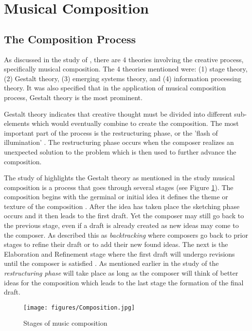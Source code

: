 \section{Musical Composition}
\subsection{The Composition Process}
As discussed in the study of , there are 4 theories involving the creative process, specifically musical composition. The 4 theories mentioned were: (1) stage theory, (2) Gestalt theory, (3) emerging systems theory, and (4) information processing theory. It was also specified that in the application of musical composition process, Gestalt theory is the most prominent. 

Gestalt theory indicates that creative thought must be divided into different sub-elements which would eventually combine to create the composition. The most important part of the process is the restructuring phase, or the 'flash of illumination' \cite{collins2005synthesis}. The restructuring phase occurs when the composer realizes an unexpected solution to the problem which is then used to further advance the composition.

The study of  highlights the Gestalt theory as mentioned in the study musical composition is a process that goes through several stages (see Figure \ref{fig:composition}). The composition begins with the germinal  or initial idea it defines the theme or texture of the composition \cite{bennett1976process,collins2005synthesis}. After the idea has taken place the sketching phase occurs and it then leads to the first draft. Yet the composer may still go back to the previous stage, even if a draft is already created as new ideas may come to the composer. As  described this as \textit{backtracking} where composers go back to prior stages to refine their draft or to add their new found ideas. The next is the Elaboration and Refinement stage where the first draft will undergo revisions until the composer is satisfied \cite{bennett1976process}. As mentioned earlier in the study of   the \textit{restructuring phase} will take place as long as the composer will think of better ideas for the composition which leads to the last stage the formation of the final draft.  

\begin{figure}[H]
    \centering
    \texttt{[image: figures/Composition.jpg]}
    \caption{Stages of music composition \protect\cite{bennett1976process}}
    \label{fig:composition}
\end{figure}

